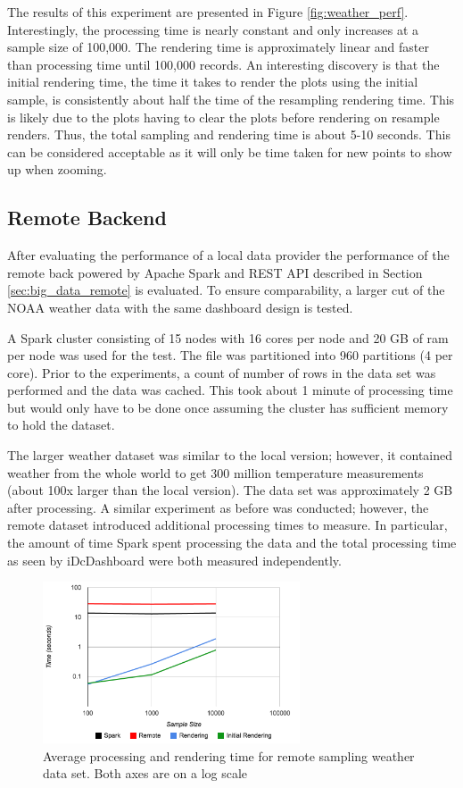 \documentclass[letter,twocolumn]{article}
\begin{document}
The results of this experiment are presented in Figure \ref{fig:weather_perf}.
Interestingly, the processing time is nearly constant and only increases  at a sample size of 100,000.
The rendering time is approximately linear and faster than processing time until 100,000 records.
An interesting discovery is that the initial rendering time, the time it takes to render the plots using the initial sample, is consistently about half the time of the resampling rendering time.
This is likely due to the plots having to clear the plots before rendering on resample renders.
Thus, the total sampling and rendering time is about 5-10 seconds.
This can be considered acceptable as it will only be time taken for new points to show up when zooming.

\subsection{Remote Backend}

After evaluating the performance of a local data provider the performance of the remote back powered by Apache Spark and REST API described in Section \ref{sec:big_data_remote} is evaluated.  
To ensure comparability, a larger cut of the NOAA weather data with the same dashboard design is tested.

A Spark cluster consisting of 15 nodes with 16 cores per node and 20 GB of ram per node was used for the test.
The file was partitioned into 960 partitions (4 per core).
Prior to the experiments, a count of number of rows in the data set was performed and the data was cached.
This took about 1 minute of processing time but would only have to be done once assuming the cluster has sufficient memory to hold the dataset.

The larger weather dataset was similar to the local version; however, it contained weather from the whole world to get 300 million temperature measurements (about 100x larger than the local version).  
The data set was approximately 2 GB after processing.
A similar experiment as before was conducted; however, the remote dataset introduced additional processing times to measure.
In particular, the amount of time Spark spent processing the data and the total processing time as seen by iDcDashboard were both measured independently.

\begin{figure}
\begin{center}
\includegraphics[width=3in]{figs/weather_big_perf.png}
\end{center}
\caption{Average processing and rendering time for remote sampling weather data set.  Both axes are on a log scale}\label{fig:weather_big_perf}
\end{figure}
\end{document}

